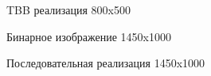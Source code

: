 \documentclass{report}
\begin{document}
\begin{figure}[H]
\caption{TBB реализация 800x500}
\end{figure}

\begin{figure}[H]
\caption{Бинарное изображение 1450x1000}
\end{figure}

\begin{figure}[H]
\caption{Последовательная реализация 1450x1000}
\end{figure}
\end{document}
